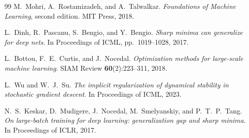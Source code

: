 \documentclass[11pt,a4paper]{article}
\theoremstyle{definition}
\theoremstyle{remark}
\begin{document}
\begin{thebibliography}{99}
M.~Mohri, A.~Rostamizadeh, and A.~Talwalkar.
\emph{Foundations of Machine Learning}, second edition.
MIT Press, 2018.

L.~Dinh, R.~Pascanu, S.~Bengio, and Y.~Bengio.
\emph{Sharp minima can generalize for deep nets}.
In Proceedings of ICML, pp.\ 1019--1028, 2017.

L.~Bottou, F.~E.~Curtis, and J.~Nocedal.
\emph{Optimization methods for large-scale machine learning}.
SIAM Review \textbf{60}(2):223--311, 2018.

L.~Wu and W.~J.~Su.
\emph{The implicit regularization of dynamical stability in stochastic
   gradient descent}.
In Proceedings of ICML, 2023.

N.~S.~Keskar, D.~Mudigere, J.~Nocedal, M.~Smelyanskiy, and P.~T.~P.~Tang.
\emph{On large-batch training for deep learning: generalization gap and
   sharp minima}.
In Proceedings of ICLR, 2017.

\end{thebibliography}
\end{document}
